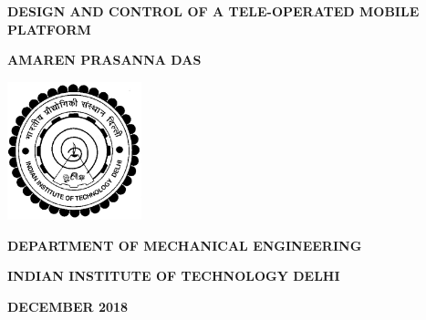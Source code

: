 \doublespacing
\thispagestyle{empty}
\begin{center}



\textbf{\large{DESIGN AND CONTROL OF A TELE-OPERATED MOBILE PLATFORM}}

\bigskip
\bigskip
\bigskip
\bigskip
\bigskip
\bigskip
\bigskip
\bigskip
\bigskip
\bigskip

\textbf{AMAREN PRASANNA DAS}

\bigskip
\bigskip
\bigskip
\bigskip
\bigskip
\bigskip
\bigskip
\bigskip
\bigskip
\bigskip
\bigskip
\bigskip
\bigskip
\bigskip
\bigskip
\bigskip
\bigskip
\bigskip
\bigskip
\bigskip
\bigskip

\includegraphics[height=4cm]{Misc_front/iitlogo.eps}

\bigskip
\bigskip
\bigskip
\bigskip
\bigskip
\bigskip

\textbf{DEPARTMENT OF MECHANICAL ENGINEERING}

\textbf{INDIAN INSTITUTE OF TECHNOLOGY DELHI}

\textbf{DECEMBER 2018}



\end{center}
\newpage
\thispagestyle{empty}
\vspace*{\fill}
\vspace*{\fill}
\mbox{}

